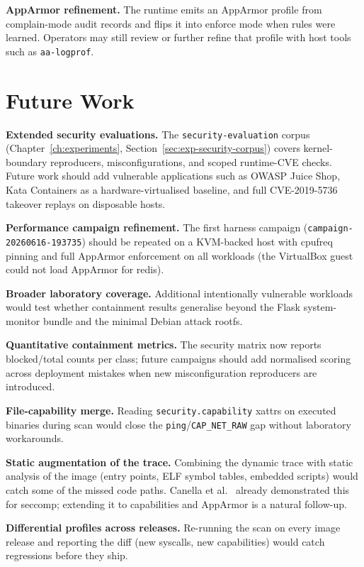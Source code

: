\textbf{AppArmor refinement.} The runtime emits an AppArmor profile from complain-mode audit records and flips it into enforce mode when rules were learned. Operators may still review or further refine that profile with host tools such as \texttt{aa-logprof}.

\section{Future Work}

\textbf{Extended security evaluations.} The \texttt{security-evaluation} corpus (Chapter~\ref{ch:experiments}, Section~\ref{sec:exp-security-corpus}) covers kernel-boundary reproducers, misconfigurations, and scoped runtime-CVE checks. Future work should add vulnerable applications such as OWASP Juice Shop, Kata Containers as a hardware-virtualised baseline, and full CVE-2019-5736 takeover replays on disposable hosts.

\textbf{Performance campaign refinement.} The first harness campaign (\texttt{campaign-20260616-193735}) should be repeated on a KVM-backed host with cpufreq pinning and full AppArmor enforcement on all workloads (the VirtualBox guest could not load AppArmor for redis).

\textbf{Broader laboratory coverage.} Additional intentionally vulnerable workloads would test whether containment results generalise beyond the Flask system-monitor bundle and the minimal Debian attack rootfs.

\textbf{Quantitative containment metrics.} The security matrix now reports blocked/total counts per class; future campaigns should add normalised scoring across deployment mistakes when new misconfiguration reproducers are introduced.

\textbf{File-capability merge.} Reading \texttt{security.capability} xattrs on executed binaries during scan would close the \texttt{ping}/\texttt{CAP\_NET\_RAW} gap without laboratory workarounds.

\textbf{Static augmentation of the trace.} Combining the dynamic trace with static analysis of the image (entry points, ELF symbol tables, embedded scripts) would catch some of the missed code paths. Canella et al.~\cite{canella2021} already demonstrated this for seccomp; extending it to capabilities and AppArmor is a natural follow-up.

\textbf{Differential profiles across releases.} Re-running the scan on every image release and reporting the diff (new syscalls, new capabilities) would catch regressions before they ship.

